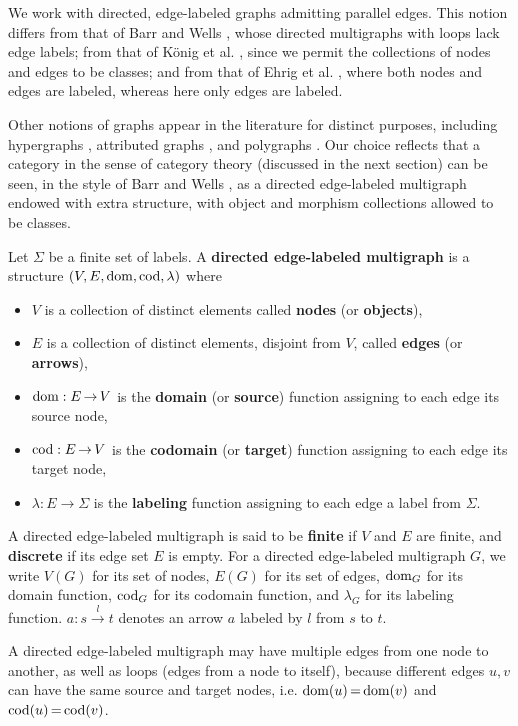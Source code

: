 We work with directed, edge-labeled graphs admitting parallel edges. This notion differs from that of Barr and Wells \cite{barr1990category}, whose directed multigraphs with loops lack edge labels; from that of König et al. \cite{konig2018atutorial}, since we permit the collections of nodes and edges to be classes; and from that of Ehrig et al. \cite{ehrig1997handbook1}, where both nodes and edges are labeled, whereas here only edges are labeled.

Other notions of graphs appear in the literature for distinct purposes, including hypergraphs \cite{plump1993hypergraph}, attributed graphs \cite{ehrig2006fundamentals}, and polygraphs \cite{ara2023polygraphs}. Our choice reflects that a category in the sense of category theory (discussed in the next section) can be seen, in the style of Barr and Wells \cite{barr1990category}, as a directed edge-labeled multigraph endowed with extra structure, with object and morphism collections allowed to be classes.
 
\begin{definition}
    \label{def:graph}
     Let \(\Sigma\) be a finite set of labels. A \textbf{directed edge-labeled multigraph} is a structure \((V, E, \operatorname{dom}, \operatorname{cod},\lambda)\) where
    \begin{itemize}
        \item $V$ is a collection of distinct elements called \textbf{nodes} (or \textbf{objects}),
        \item $E$ is a collection of distinct elements, disjoint from $V$, called \textbf{edges} (or \textbf{arrows}),
        \item $\operatorname{dom}: E \mathop{\to} V$ is the \textbf{domain} (or \textbf{source}) function assigning to each edge its source node,
        \item $\operatorname{cod}: E \mathop{\to} V$ is the \textbf{codomain} (or \textbf{target}) function assigning to each edge its target node,
        \item $\lambda: E \mathop{\to} \Sigma$ is the \textbf{labeling} function assigning to each edge a label from $\Sigma$.
    \end{itemize}
    A directed edge-labeled multigraph is said to be \textbf{finite} if $V$ and $E$ are finite, and \textbf{discrete} if its edge set \(E\) is empty.
    For a directed edge-labeled multigraph \( G \), we write \( V(G) \) for its set of nodes, \( E(G) \) for its set of edges, \( \operatorname{dom}_G \) for its domain function, \( \operatorname{cod}_G \) for its codomain function, and \( \lambda_G \) for its labeling function. $a : s\overset{l}{\rightarrow} t$ denotes an arrow $a$ labeled by $l$ from $s$ to $t$.
\end{definition}
A directed edge-labeled multigraph may have multiple edges from one node to another, as well as loops (edges from a node to itself), because different edges $u,v$ can have the same source and target nodes, i.e. $\operatorname{dom}(u) \mathop{=} \operatorname{dom}(v)$ and $\operatorname{cod}(u) \mathop{=} \operatorname{cod}(v)$.

